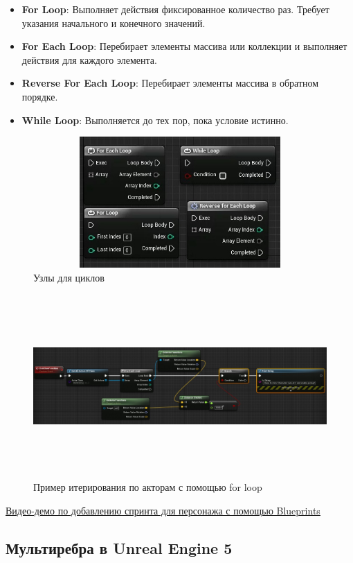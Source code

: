 \begin{itemize}
    \item \textbf{For Loop}: Выполняет действия фиксированное количество раз. Требует указания начального и конечного значений.
    \item \textbf{For Each Loop}: Перебирает элементы массива или коллекции и выполняет действия для каждого элемента.
    \item \textbf{Reverse For Each Loop}: Перебирает элементы массива в обратном порядке.
    \item \textbf{While Loop}: Выполняется до тех пор, пока условие истинно.
\end{itemize}
\begin{figure}[H]
    \centering
    \includegraphics[height=5cm, width=13cm]{loop_blueprints.jpeg}
    \caption{Узлы для циклов}
\end{figure}
\begin{figure}[H]
    \centering
    \includegraphics[height=7cm, width=13cm]{loop_example.jpeg}
    \caption{Пример итерирования по акторам с помощью for loop}
\end{figure}

\href{https://drive.google.com/file/d/1bpvySAOp3d32BuroTV2EeSUZdUUCpDe9/view?usp=drive_link}{\underline{Видео-демо по добавлению спринта для персонажа с помощью Blueprints}}

\subsection{Мультиребра в Unreal Engine 5}


